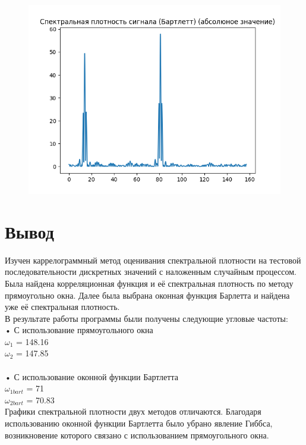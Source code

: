 \documentclass[12pt]{article}
\begin{document}
\begin{figure}[!htb]
\centering
\includegraphics[scale=1.00]{sig_spectral_density_bart_abs.png}
\caption{}
\label{}
\end{figure}



\section{Вывод}
Изучен каррелограммный метод оценивания спектральной плотности на тестовой последовательности дискретных значений с наложенным случайным процессом. Была найдена корреляционная функция и её спектральная плотность по методу прямоугольно окна. Далее была выбрана оконная функция Барлетта и найдена уже её спектральная плотность.\\
В результате работы программы были получены следующие угловые частоты:\\
    • С использование прямоугольного окна\\
$\omega_{1}$ = 148.16\\
$\omega_{2}$ = 147.85\\
\\
    • С использование оконной функции Бартлетта\\
$\omega_{1bart}$ = 71\\
$\omega_{2bart}$ = 70.83\\

Графики спектральной плотности двух методов отличаются. Благодаря использованию оконной функции Бартлетта было убрано явление Гиббса, возникновение которого связано с использованием прямоугольного окна.
\end{document}
